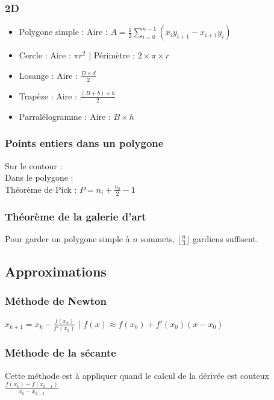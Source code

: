 \documentclass[8pt]{article}
\begin{document}
            \subsubsection{2D}
            \begin{itemize}
                \item Polygone simple : Aire : $A = \frac{1}{2} \sum_{i=0}^{n-1}\left(x_{i}y_{i+1} - x_{i+1}y_{i}\right)$
                \item Cercle : Aire : $\pi r^{2}$ | Périmètre : $2\times \pi \times r$
                \item Losange : Aire : $\frac{D\times d}{2}$
                \item Trapèze : Aire : $\frac{(B+b)\times h}{2}$
                \item Parralélogramme : Aire : $B\times h$
            \end{itemize}
            \subsubsection{Points entiers dans un polygone}
                Sur le contour : \\
                Dans le polygone : \\
                Théorème de Pick :
                $P = n_{i} + \frac{n_{b}}{2}-1$
            \subsubsection{Théorème de la galerie d'art}
            Pour garder un polygone simple à $n$ sommets, $\lfloor \frac{n}{3} \rfloor$ gardiens suffisent.
        \subsection{Approximations}
            \subsubsection{Méthode de Newton}
            $x_{k+1} = x_{k} - \frac{f(x_{k})}{f'(x_{k})}$ | $f(x) \approx f(x_{0}) + f'(x_{0})(x-x_{0})$
            \subsubsection{Méthode de la sécante}
            Cette méthode est à appliquer quand le calcul de la dérivée est couteux
            $\frac{f(x_{k} )- f(x_{k-1})}{x_{k} - x_{k-1}}$
\end{document}
